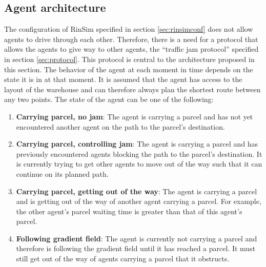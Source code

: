 \subsection{Agent architecture}\label{sec:agentarch}
The configuration of RinSim specified in section \ref{sec:rinsimconf} does not allow agents to drive through each other. Therefore, there is a need for a protocol that allows the agents to give way to other agents, the ``traffic jam protocol'' specified in section \ref{sec:protocol}. This protocol is central to the architecture proposed in this section. The behavior of the agent at each moment in time depends on the state it is in at that moment. It is assumed that the agent has access to the layout of the warehouse and can therefore always plan the shortest route between any two points. The state of the agent can be one of the following:
\begin{enumerate}
\item \textbf{Carrying parcel, no jam}: The agent is carrying a parcel and has not yet encountered another agent on the path to the parcel's destination.
\item \textbf{Carrying parcel, controlling jam}: The agent is carrying a parcel and has previously encountered agents blocking the path to the parcel's destination. It is currently trying to get other agents to move out of the way such that it can continue on its planned path.
\item \textbf{Carrying parcel, getting out of the way}: The agent is carrying a parcel and is getting out of the way of another agent carrying a parcel. For example, the other agent's parcel waiting time is greater than that of this agent's parcel.
\item \textbf{Following gradient field}: The agent is currently not carrying a parcel and therefore is following the gradient field until it has reached a parcel. It must still get out of the way of agents carrying a parcel that it obstructs.
\end{enumerate}

